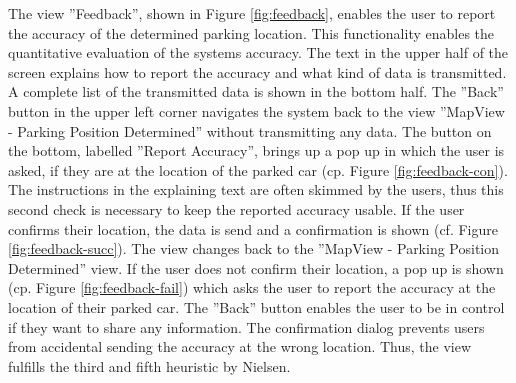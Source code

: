 The view ''Feedback'', shown in Figure \ref{fig:feedback}, enables the user to report the accuracy of the determined parking location. This functionality enables the quantitative evaluation of the systems accuracy. The text in the upper half of the screen explains how to report the accuracy and what kind of data is transmitted. A complete list of the transmitted data is shown in the bottom half. The ''Back'' button in the upper left corner navigates the system back to the view ''MapView - Parking Position Determined'' without transmitting any data. The button on the bottom, labelled ''Report Accuracy'', brings up a pop up in which the user is asked, if they are at the location of the parked car (cp. Figure \ref{fig:feedback-con}). The instructions in the explaining text are often skimmed by the users, thus this second check is necessary to keep the reported accuracy usable. If the user confirms their location, the data is send and a confirmation is shown (cf. Figure \ref{fig:feedback-succ}). The view changes back to the ''MapView - Parking Position Determined'' view. If the user does not confirm their location, a pop up is shown (cp. Figure \ref{fig:feedback-fail}) which asks the user to report the accuracy at the location of their parked car. The ''Back'' button enables the user to be in control if they want to share any information. The confirmation dialog prevents users from accidental sending the accuracy at the wrong location. Thus, the view fulfills the third and fifth heuristic by Nielsen. \cite{nielsen1994usability}

